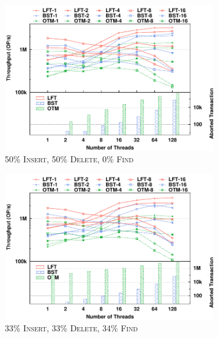 \documentclass[]{sig-alternate-05-2015}
\begin{document}
\begin{figure}[p]
    \begin{subfigure}{1\columnwidth}
        \centering
        \includegraphics[width=1\columnwidth]{./data/amdskip50ins10kfilled.pdf}
        \caption{50\% \textsc{Insert}, 50\% \textsc{Delete}, 0\% \textsc{Find}}
        \label{fig:txnskip50}
    \end{subfigure}
    \hfill
    \begin{subfigure}{1\columnwidth}
        \centering
        \includegraphics[width=1\columnwidth]{./data/amdskip33ins10kfilled.pdf}
        \caption{33\% \textsc{Insert}, 33\% \textsc{Delete}, 34\% \textsc{Find}}
        \label{fig:txnskip33}
    \end{subfigure}
    \hfill
    \begin{subfigure}{1\columnwidth}
        \centering

\end{subfigure}
\end{figure}
\end{document}
